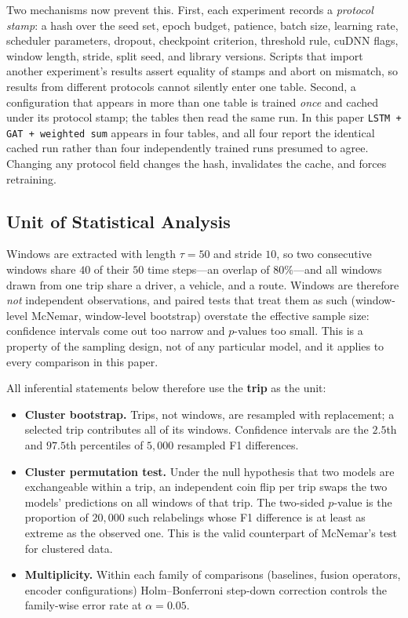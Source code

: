 \documentclass[journal]{IEEEtran}
\begin{document}
Two mechanisms now prevent this. First, each experiment records a \emph{protocol stamp}: a hash over the seed set, epoch budget, patience, batch size, learning rate, scheduler parameters, dropout, checkpoint criterion, threshold rule, cuDNN flags, window length, stride, split seed, and library versions. Scripts that import another experiment's results assert equality of stamps and abort on mismatch, so results from different protocols cannot silently enter one table. Second, a configuration that appears in more than one table is trained \emph{once} and cached under its protocol stamp; the tables then read the same run. In this paper \texttt{LSTM + GAT + weighted sum} appears in four tables, and all four report the identical cached run rather than four independently trained runs presumed to agree. Changing any protocol field changes the hash, invalidates the cache, and forces retraining.

\subsection{Unit of Statistical Analysis}
\label{sec:statistical_unit}
Windows are extracted with length $\tau = 50$ and stride $10$, so two consecutive windows share $40$ of their $50$ time steps---an overlap of $80\%$---and all windows drawn from one trip share a driver, a vehicle, and a route. Windows are therefore \emph{not} independent observations, and paired tests that treat them as such (window-level McNemar, window-level bootstrap) overstate the effective sample size: confidence intervals come out too narrow and $p$-values too small. This is a property of the sampling design, not of any particular model, and it applies to every comparison in this paper.

All inferential statements below therefore use the \textbf{trip} as the unit:

\begin{itemize}
  \item \textbf{Cluster bootstrap.} Trips, not windows, are resampled with replacement; a selected trip contributes all of its windows. Confidence intervals are the $2.5$th and $97.5$th percentiles of $5{,}000$ resampled F1 differences.
  \item \textbf{Cluster permutation test.} Under the null hypothesis that two models are exchangeable within a trip, an independent coin flip per trip swaps the two models' predictions on all windows of that trip. The two-sided $p$-value is the proportion of $20{,}000$ such relabelings whose F1 difference is at least as extreme as the observed one. This is the valid counterpart of McNemar's test for clustered data.
  \item \textbf{Multiplicity.} Within each family of comparisons (baselines, fusion operators, encoder configurations) Holm--Bonferroni step-down correction controls the family-wise error rate at $\alpha = 0.05$.
\end{itemize}
\end{document}

